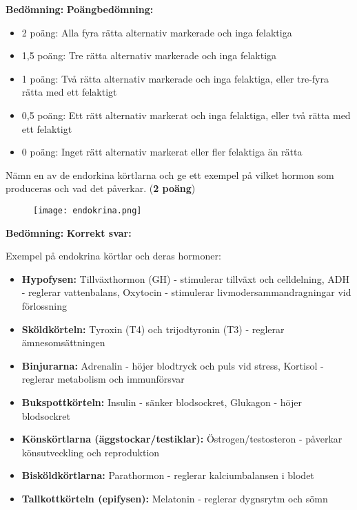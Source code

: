 \documentclass{exam}
\newenvironment{answer}
  {\begin{framed}\color{blue}\textbf{Bedömning:} }
  {\end{framed}}
\begin{document}
\begin{questions}
\begin{answer}
\textbf{Poängbedömning:}
\begin{itemize}
  \item 2 poäng: Alla fyra rätta alternativ markerade och inga felaktiga
  \item 1,5 poäng: Tre rätta alternativ markerade och inga felaktiga
  \item 1 poäng: Två rätta alternativ markerade och inga felaktiga, eller tre-fyra rätta med ett felaktigt
  \item 0,5 poäng: Ett rätt alternativ markerat och inga felaktiga, eller två rätta med ett felaktigt
  \item 0 poäng: Inget rätt alternativ markerat eller fler felaktiga än rätta
\end{itemize}
\end{answer}

\break
\question Nämn en av de endorkina körtlarna och ge ett exempel på vilket hormon som produceras och vad det påverkar. (\textbf{2 poäng})
\begin{figure}[h]
\texttt{[image: endokrina.png]}
\end{figure}
\vspace{5mm}

\begin{answer}
\textbf{Korrekt svar:}

Exempel på endokrina körtlar och deras hormoner:
\begin{itemize}
  \item \textbf{Hypofysen:} Tillväxthormon (GH) - stimulerar tillväxt och celldelning, ADH - reglerar vattenbalans, Oxytocin - stimulerar livmodersammandragningar vid förlossning
  \item \textbf{Sköldkörteln:} Tyroxin (T4) och trijodtyronin (T3) - reglerar ämnesomsättningen
  \item \textbf{Binjurarna:} Adrenalin - höjer blodtryck och puls vid stress, Kortisol - reglerar metabolism och immunförsvar
  \item \textbf{Bukspottkörteln:} Insulin - sänker blodsockret, Glukagon - höjer blodsockret
  \item \textbf{Könskörtlarna (äggstockar/testiklar):} Östrogen/testosteron - påverkar könsutveckling och reproduktion
  \item \textbf{Bisköldkörtlarna:} Parathormon - reglerar kalciumbalansen i blodet
  \item \textbf{Tallkottkörteln (epifysen):} Melatonin - reglerar dygnsrytm och sömn
\end{itemize}


\end{answer}
\end{questions}
\end{document}
